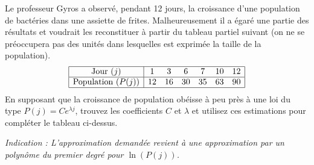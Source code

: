 \begin{exercice}\label{exoMatlab0025}

Le professeur Gyros a observé, pendant 12 jours, la croissance d'une population de bactéries dans une assiette de frites. Malheureusement il a égaré une partie des résultats et voudrait les reconstituer à partir du tableau partiel suivant (on ne se préoccupera pas des unités dans lesquelles est exprimée la taille de la population).
\[ \begin{array}{|c|cccccc|}
\hline
\text{Jour } (j) & 1 & 3 & 6 & 7 & 10 & 12 \\
\hline
\text{Population } (P(j)) & 12 & 16 & 30 & 35 & 63 & 90 \\
\hline
\end{array} \]
En supposant que la croissance de population obéisse à peu près à une loi du type $P(j)=Ce^{\lambda j}$, trouvez les coefficients $C$ et $\lambda$ et utilisez ces estimations pour compléter le tableau ci-dessus.

\emph{Indication : L'approximation demandée revient à une approximation par un polynôme du premier degré pour $\ln(P(j))$.}

\end{exercice}
